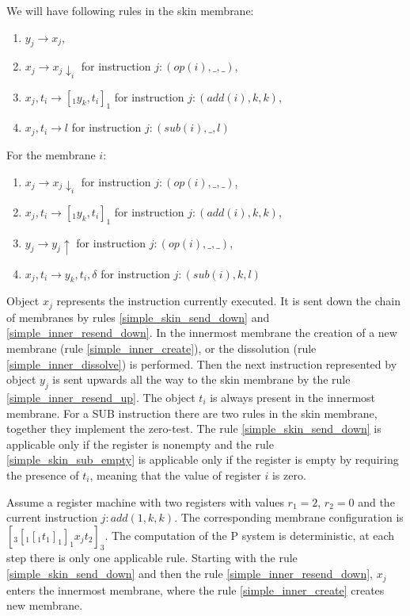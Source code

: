 \documentclass[llncs,submission,copyright,creativecommons]{../lib/lncs/llncs}
\begin{document}
We will have following rules in the skin membrane:
\begin{enumerate}
  \item\label{simple_skin_next_instruction} $y_j \rightarrow x_j$,
  \item\label{simple_skin_send_down} $x_j \rightarrow x_j\downarrow_{i}$ for instruction $j: (op(i), \_, \_)$,
  \item\label{simple_skin_create} $x_j, t_i \rightarrow [_1 y_k, t_i ]_1$ for instruction $j: (add(i), k, k)$,
  \item\label{simple_skin_sub_empty} $x_j, t_i \rightarrow l$ for instruction $j: (sub(i), \_, l)$
\end{enumerate}

For the membrane $i$:
\begin{enumerate}[resume]
  \item\label{simple_inner_resend_down} $x_j \rightarrow x_j\downarrow_{i}$ for instruction $j: (op(i), \_, \_)$,
  \item\label{simple_inner_create} $x_j, t_i \rightarrow [_1 y_k, t_i ]_1$ for instruction $j: (add(i), k, k)$,
  \item\label{simple_inner_resend_up} $y_j \rightarrow y_j\uparrow$ for instruction $j: (op(i), \_, \_)$,
  \item\label{simple_inner_dissolve} $x_j, t_i \rightarrow y_k, t_i, \delta$ for instruction $j: (sub(i), k, l)$
\end{enumerate}

Object $x_j$ represents the instruction currently executed. It is sent down the chain of membranes by rules \ref{simple_skin_send_down} and \ref{simple_inner_resend_down}. In the innermost membrane the creation of a new membrane (rule \ref{simple_inner_create}), or the dissolution (rule \ref{simple_inner_dissolve}) is performed. Then the next instruction represented by object $y_j$ is sent upwards all the way to the skin membrane by the rule \ref{simple_inner_resend_up}. The object $t_i$ is always present in the innermost membrane. For a SUB instruction there are two rules in the skin membrane, together they implement the zero-test. The rule \ref{simple_skin_send_down} is applicable only if the register is nonempty and the rule \ref{simple_skin_sub_empty} is applicable only if the register is empty by requiring the presence of $t_i$, meaning that the value of register $i$ is zero.

\begin{example}
  Assume a register machine with two registers with values $r_1=2$, $r_2=0$ and the current instruction $j: add(1,k,k)$. The corresponding membrane configuration is $[_3 [_1 [_1 t_1 ]_1 ]_1 x_j t_2]_3$. The computation of the P system is deterministic, at each step there is only one applicable rule. Starting with the rule \ref{simple_skin_send_down} and then the rule \ref{simple_inner_resend_down}, $x_j$ enters the innermost membrane, where the rule \ref{simple_inner_create} creates new membrane.
\end{example}
\end{document}
